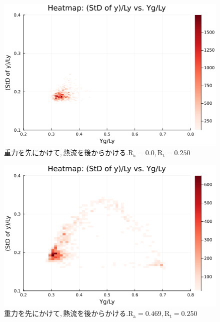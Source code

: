 \begin{figure}[H]
  \centering
  \includegraphics[scale=0.6]{image/RaRtmap_drop_heat/2023-12-21T10:44:57.897_RaRtmap_chi1.265_Ay50_rho0.4_T0.43_dT0.04_Rd0.0_Rt0.25_Ra0.0_g0.0003999718779659611_run4.0e7.png}
  \caption{$重力を先にかけて, 熱流を後からかける. \text{R}_\text{a}=0.0,\text{R}_\text{t}=0.250$}
  \label{}
\end{figure}

\begin{figure}[H]
  \centering
  \includegraphics[scale=0.6]{image/RaRtmap_drop_heat/2023-12-21T10:44:57.979_RaRtmap_chi1.265_Ay50_rho0.4_T0.43_dT0.04_Rd0.0_Rt0.25_Ra0.4693845_g0.0003999718779659611_run4.0e7.png}
  \caption{$重力を先にかけて, 熱流を後からかける. \text{R}_\text{a}=0.469,\text{R}_\text{t}=0.250$}
  \label{}
\end{figure}

